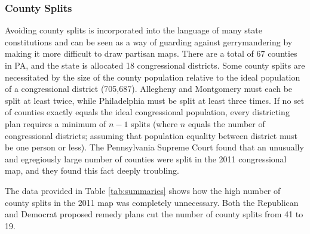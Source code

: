             \subsubsection*{County Splits}
    Avoiding county splits is incorporated into the language of many state constitutions \citep{Grofman1985} and can be seen as a way of guarding against gerrymandering by making it more difficult to draw partisan maps. There are a total of 67 counties in PA, and the state is allocated 18 congressional districts. Some county splits are necessitated by the size of the county population relative to the ideal population of a congressional district (705,687). Allegheny and Montgomery must each be split at least twice, while Philadelphia must be split at least three times. If no set of counties exactly equals the ideal congressional population, every districting plan requires a minimum of $n-1$ splits (where $n$ equals the number of congressional districts; assuming that population equality between district must be one person or less). The Pennsylvania Supreme Court found that an unusually and egregiously large number of counties were split in the 2011 congressional map, and they found this fact deeply troubling.
\par
    The data provided in Table \ref{tab:summaries} shows how the high number of county splits in the 2011 map was completely unnecessary. Both the Republican and Democrat proposed remedy plans cut the number of county splits from 41 to 19.
